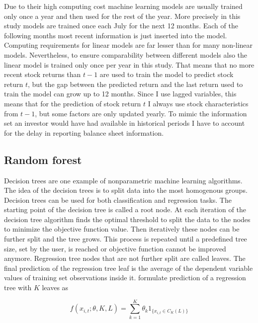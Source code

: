 \documentclass[12pt]{article}
\begin{document}
Due to their high computing cost machine learning models are usually trained only once a year and then used for the rest of the year. More precisely in this study models are trained once each July for the next 12 months. Each of the following months most recent information is just inserted into the model. Computing requirements for linear models are far lesser than for many non-linear models. Nevertheless, to ensure comparability between different models also the linear model is trained only once per year in this study. That means that no more recent stock returns than $t-1$ are used to train the model to predict stock return $t$, but the gap between the predicted return and the last return used to train the model can grow up to 12 months. Since I use lagged variables, this means that for the prediction of stock return $t$ I always use stock characteristics from $t-1$, but some factors are only updated yearly. To mimic the information set an investor would have had available in historical periods I have to account for the delay in reporting balance sheet information. \par

\subsection{Random forest}

Decision trees are one example of nonparametric machine learning algorithms. The idea of the decision trees is to split data into the most homogenous groups. Decision trees can be used for both classification and regression tasks. The starting point of the decision tree is called a root node. At each iteration of the decision tree algorithm finds the optimal threshold to split the data to the nodes to minimize the objective function value. Then iteratively these nodes can be further split and the tree grows. This process is repeated until a predefined tree size, set by the user, is reached or objective function cannot be improved anymore. Regression tree nodes that are not further split are called leaves. The final prediction of the regression tree leaf is the average of the dependent variable values of training set observations inside it. \citet{guetal} formulate prediction of a regression tree with $K$ leaves as \par

\begin{equation}
f(x_{i, t}; \theta, K, L) = \sum_{k=1}^K \theta_k 1 _{\{x_{i, t} \in C_K(L)\}}
\end{equation}
\end{document}

